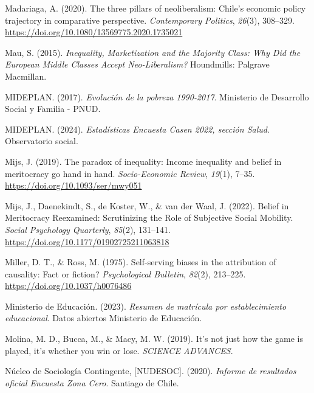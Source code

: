 \documentclass[
  13pt,
]{article}
\newlength{\cslhangindent}
\newenvironment{CSLReferences}[2] %
 {\begin{list}{}{%
  \setlength{\itemindent}{0pt}
  \setlength{\leftmargin}{0pt}
  \setlength{\parsep}{0pt}
  \ifodd #1
   \setlength{\leftmargin}{\cslhangindent}
   \setlength{\itemindent}{-1\cslhangindent}
  \fi
  \setlength{\itemsep}{#2\baselineskip}}}
 {\end{list}}
\begin{document}
\begin{CSLReferences}{1}{0}
Madariaga, A. (2020). The three pillars of neoliberalism: {Chile}'s
economic policy trajectory in comparative perspective.
\emph{Contemporary Politics}, \emph{26}(3), 308--329.
\url{https://doi.org/10.1080/13569775.2020.1735021}

Mau, S. (2015). \emph{Inequality, {Marketization} and the {Majority
Class}: {Why Did} the {European Middle Classes Accept Neo-Liberalism}?}
Houndmills: Palgrave Macmillan.

MIDEPLAN. (2017). \emph{Evoluci{ó}n de la pobreza 1990-2017}. Ministerio
de Desarrollo Social y Familia - PNUD.

MIDEPLAN. (2024). \emph{Estad{í}sticas {Encuesta Casen} 2022, secci{ó}n
{Salud}}. Observatorio social.

Mijs, J. (2019). The paradox of inequality: Income inequality and belief
in meritocracy go hand in hand. \emph{Socio-Economic Review},
\emph{19}(1), 7--35. \url{https://doi.org/10.1093/ser/mwy051}

Mijs, J., Daenekindt, S., de Koster, W., \& van der Waal, J. (2022).
Belief in {Meritocracy Reexamined}: {Scrutinizing} the {Role} of
{Subjective Social Mobility}. \emph{Social Psychology Quarterly},
\emph{85}(2), 131--141. \url{https://doi.org/10.1177/01902725211063818}

Miller, D. T., \& Ross, M. (1975). Self-serving biases in the
attribution of causality: {Fact} or fiction? \emph{Psychological
Bulletin}, \emph{82}(2), 213--225.
\url{https://doi.org/10.1037/h0076486}

Ministerio de Educación. (2023). \emph{Resumen de matr{í}cula por
establecimiento educacional}. Datos abiertos Ministerio de Educaci{ó}n.

Molina, M. D., Bucca, M., \& Macy, M. W. (2019). It's not just how the
game is played, it's whether you win or lose. \emph{SCIENCE ADVANCES}.

Núcleo de Sociología Contingente, {[}NUDESOC{]}. (2020). \emph{Informe
de resultados oficial {Encuesta Zona Cero}}. Santiago de Chile.


\end{CSLReferences}
\end{document}
